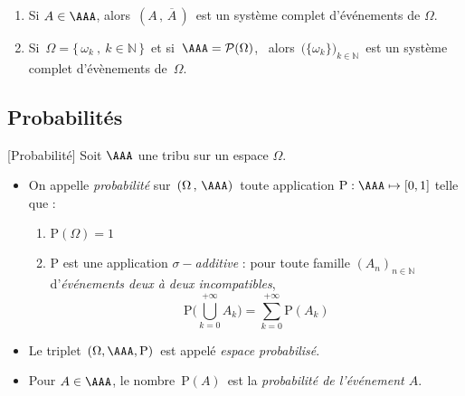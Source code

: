 \documentclass[french,11pt,twoside]{VcCours}
\renewcommand{\P}{\text{P}}
\begin{document}
\begin{Exemples}
\begin{enumerate}
\item Si $A\in \AAA$, alors $\,(A\,,\,\overline A\,)\,$ est un système complet d'événements de $\Omega$.
\item Si $\,\Omega = \{\,\omega _k\ , \ k\in  \mathbb N\,\}\,$ 
et si $\,\AAA = \mathcal P(\Omega )$, \ 
alors $\,\big(\{\omega _k\}\big) _{k\in \mathbb N}\,$ 
est un système complet d'évènements de $\,\Omega$.
\end{enumerate}
\end{Exemples}

\subsection{Probabilités}

\begin{Definition}{}[Probabilité]
Soit $\AAA$ une tribu sur un espace $\Omega$. 

\begin{itemize}
\item On appelle \emph{probabilité} sur $\,(\Omega\,,\,\AAA)\,$ toute application $\P : \AAA \mapsto [0,1]$ telle que : 
\begin{enumerate}
\item $\P(\Omega )=1$
\item $\P$ est une application \emph{$\sigma -$additive} : pour toute famille $(A_n)_{n\in \mathbb N}$ d'\emph{événements deux à deux incompatibles}, 
\[ \P\Big(\bigcup\limits_{k=0}^{+ \infty} A_k\Big) = \sum\limits_{k=0}^{+\infty } \P(A_k)  \]
\end{enumerate}
\item Le triplet $\,(\Omega , \AAA , \P)\,$ est appelé \emph{espace probabilisé}. 
\item Pour $A\in\AAA$, le nombre $\,\P(A)\,$ est la \emph{probabilité de l'événement $A$}.
\end{itemize} 
\end{Definition}
\end{document}
